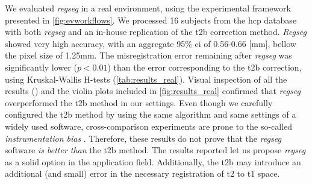 We evaluated \emph{regseg} in a real environment, using the experimental framework presented
  in \autoref{fig:evworkflows}.
We processed 16 subjects from the \gls*{hcp} database with both \emph{regseg}
  and an in-house replication of the \gls*{t2b} correction method.
\emph{Regseg} showed very high accuracy, with an aggregate 95\% \gls*{ci} of 0.56-0.66 [mm],
  bellow the pixel size of 1.25mm.
The misregistration error remaining after \emph{regseg} was significantly lower ($p < 0.01$) than the
  error corresponding to the \gls*{t2b} correction, using Kruskal-Wallis H-tests
  (\autoref{tab:results_real}).
Visual inspection of all the results () and the violin plots included in
  \autoref{fig:results_real} confirmed that \emph{regseg} overperformed the \gls*{t2b} method
  in our settings.
Even though we carefully configured the \gls*{t2b} method by using the same algorithm and
  same settings of a widely used software, cross-comparison experiments are prone to
  the so-called \emph{instrumentation bias} \citep{tustison_instrumentation_2013}.
Therefore, these results do not prove that the \emph{regseg} software \emph{is better than} the
  \gls*{t2b} method.
The results reported let us propose \emph{regseg} as a solid option in the application field.
Additionally, the \gls*{t2b} may introduce an additional (and small) error in the necessary
  registration of \gls*{t2} to \gls*{t1} space.

